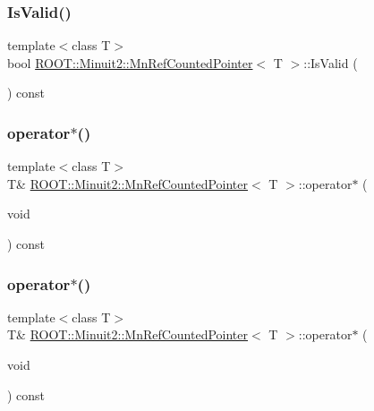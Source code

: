 \subsubsection{\texorpdfstring{IsValid()}{IsValid()}\hspace{0.1cm}{\footnotesize\ttfamily [2/2]}}
{\footnotesize\ttfamily template$<$class T$>$ \\
bool \mbox{\hyperlink{classROOT_1_1Minuit2_1_1MnRefCountedPointer}{R\+O\+O\+T\+::\+Minuit2\+::\+Mn\+Ref\+Counted\+Pointer}}$<$ T $>$\+::Is\+Valid (\begin{DoxyParamCaption}{ }\end{DoxyParamCaption}) const\hspace{0.3cm}{\ttfamily [inline]}}

\mbox{\label{classROOT_1_1Minuit2_1_1MnRefCountedPointer_ab926bb95d092c87afef79bb6c1776bd4}} 
\subsubsection{\texorpdfstring{operator$\ast$()}{operator*()}\hspace{0.1cm}{\footnotesize\ttfamily [1/2]}}
{\footnotesize\ttfamily template$<$class T$>$ \\
T\& \mbox{\hyperlink{classROOT_1_1Minuit2_1_1MnRefCountedPointer}{R\+O\+O\+T\+::\+Minuit2\+::\+Mn\+Ref\+Counted\+Pointer}}$<$ T $>$\+::operator$\ast$ (\begin{DoxyParamCaption}\item[{void}]{ }\end{DoxyParamCaption}) const\hspace{0.3cm}{\ttfamily [inline]}}

\mbox{\label{classROOT_1_1Minuit2_1_1MnRefCountedPointer_ab926bb95d092c87afef79bb6c1776bd4}} 
\subsubsection{\texorpdfstring{operator$\ast$()}{operator*()}\hspace{0.1cm}{\footnotesize\ttfamily [2/2]}}
{\footnotesize\ttfamily template$<$class T$>$ \\
T\& \mbox{\hyperlink{classROOT_1_1Minuit2_1_1MnRefCountedPointer}{R\+O\+O\+T\+::\+Minuit2\+::\+Mn\+Ref\+Counted\+Pointer}}$<$ T $>$\+::operator$\ast$ (\begin{DoxyParamCaption}\item[{void}]{ }\end{DoxyParamCaption}) const\hspace{0.3cm}{\ttfamily [inline]}}

